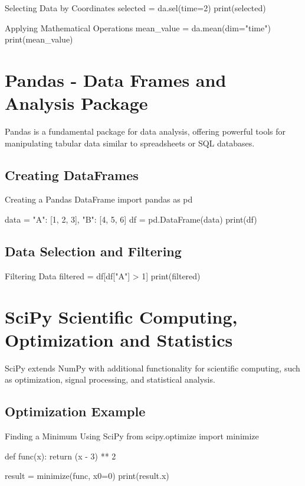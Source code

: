 \begin{codeonly}{Selecting Data by Coordinates}
selected = da.sel(time=2)
print(selected)
\end{codeonly}

\begin{codeonly}{Applying Mathematical Operations}
mean_value = da.mean(dim="time")
print(mean_value)
\end{codeonly}

\section{Pandas - Data Frames and Analysis Package}
Pandas is a fundamental package for data analysis, offering powerful tools for manipulating tabular data similar to spreadsheets or SQL databases.

\subsection{Creating DataFrames}

\begin{codeonly}{Creating a Pandas DataFrame}
import pandas as pd

data = {"A": [1, 2, 3], "B": [4, 5, 6]}
df = pd.DataFrame(data)
print(df)
\end{codeonly}

\subsection{Data Selection and Filtering}

\begin{codeonly}{Filtering Data}
filtered = df[df["A"] > 1]
print(filtered)
\end{codeonly}

\section{SciPy Scientific Computing, Optimization and Statistics}
SciPy extends NumPy with additional functionality for scientific computing, such as optimization, signal processing, and statistical analysis.

\subsection{Optimization Example}

\begin{codeonly}{Finding a Minimum Using SciPy}
from scipy.optimize import minimize

def func(x):
    return (x - 3) ** 2

result = minimize(func, x0=0)
print(result.x)
\end{codeonly}

